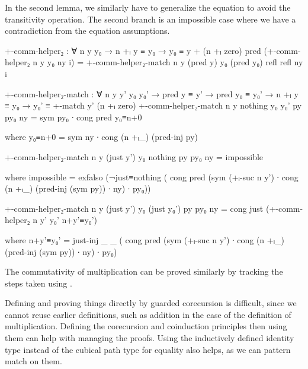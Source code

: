 In the second lemma, we similarly have to generalize the equation to avoid the
transitivity operation. The second branch is an impossible case where we have a
contradiction from the equation assumptions.
\begin{AgdaSuppressSpace}
\begin{code}
  +-comm-helper₂ :
    ∀ n y y₀ → n +ₗ y ≡ y₀ → y₀ ≡ y + (n +ₗ zero)
  pred (+-comm-helper₂ n y y₀ ny i) =
    +-comm-helper₂-match
      n y (pred y) y₀ (pred y₀) refl refl ny i

  +-comm-helper₂-match :
    ∀ n y y' y₀ y₀' →
    pred y ≡ y' → pred y₀ ≡ y₀' → n +ₗ y ≡ y₀ →
    y₀' ≡ +-match y' (n +ₗ zero)
  +-comm-helper₂-match n y nothing y₀ y₀' py py₀ ny =
    sym py₀ ∙ cong pred y₀≡n+0
\end{code}
\begin{code}[hide]
    where
    y₀≡n+0 = sym ny ∙ cong (n +ₗ_) (pred-inj py)
\end{code}
\begin{code}
  +-comm-helper₂-match n y (just y') y₀ nothing py py₀ ny
    = impossible
\end{code}
\begin{code}[hide]
    where
    impossible =
      exfalso
        (¬just≡nothing
          ( cong pred
              (sym (+ₗ-suc n y') ∙ cong (n +ₗ_) (pred-inj (sym py)) ∙ ny) ∙
            py₀))
\end{code}
\begin{code}
  +-comm-helper₂-match n y (just y') y₀ (just y₀') py py₀ ny
    = cong just (+-comm-helper₂ n y' y₀' n+y'≡y₀')
\end{code}
\begin{code}[hide]
    where
    n+y'≡y₀' =
      just-inj _ _
        ( cong pred
            (sym (+ₗ-suc n y') ∙ cong (n +ₗ_) (pred-inj (sym py)) ∙ ny) ∙
          py₀)
\end{code}
\end{AgdaSuppressSpace}

The commutativity of multiplication can be proved similarly by tracking the
steps taken using .

Defining and proving things directly by guarded corecursion is difficult, since
we cannot reuse earlier definitions, such as addition in the case of the
definition of multiplication. Defining the corecursion and coinduction
principles then using them can help with managing the proofs. Using the
inductively defined identity type instead of the cubical path type for equality
also helps, as we can pattern match on them.
